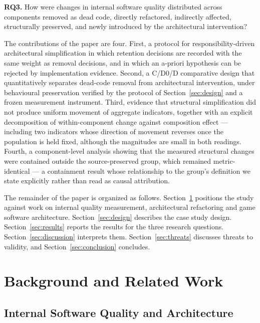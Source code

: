 \documentclass{sbc2019}%
\begin{document}
\medskip\noindent\textbf{RQ3.} How were changes in internal software quality
distributed across components removed as dead code, directly refactored,
indirectly affected, structurally preserved, and newly introduced by the
architectural intervention?

\medskip

The contributions of the paper are four. First, a protocol for
responsibility-driven architectural simplification in which retention decisions
are recorded with the same weight as removal decisions, and in which an a-priori
hypothesis can be rejected by implementation evidence. Second, a C/D0/D
comparative design that quantitatively separates dead-code removal from
architectural intervention, under behavioural preservation verified by the
protocol of Section~\ref{sec:design} and a frozen measurement instrument. Third,
evidence that structural simplification did not produce uniform movement of
aggregate indicators, together with an explicit decomposition of within-component
change against composition effect --- including two indicators whose direction of
movement reverses once the population is held fixed, although the magnitudes are
small in both readings. Fourth, a component-level analysis showing that the
measured structural changes were contained outside the source-preserved group,
which remained metric-identical --- a containment result whose relationship to the
group's definition we state explicitly rather than read as causal attribution.

The remainder of the paper is organized as follows. Section~\ref{sec:related}
positions the study against work on internal quality measurement, architectural
refactoring and game software architecture. Section~\ref{sec:design} describes
the case study design. Section~\ref{sec:results} reports the results for the
three research questions. Section~\ref{sec:discussion} interprets them.
Section~\ref{sec:threats} discusses threats to validity, and
Section~\ref{sec:conclusion} concludes.


\section{Background and Related Work}\label{sec:related}

\subsection{Internal Software Quality and Architecture}
\end{document}
